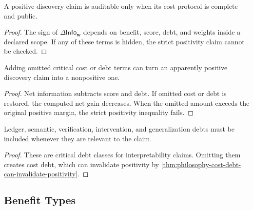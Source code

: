
\begin{theorem}
\label{thm:philosophy-positive-discovery-requires-protocol-completeness}
A positive discovery claim is auditable only when its cost protocol is
complete and public.
\end{theorem}
\begin{proof}
The sign of $\Delta\mathsf{Info}_{\mathbf w}$ depends on benefit, score,
debt, and weights inside a declared scope. If any of these terms is
hidden, the strict positivity claim cannot be checked.
\end{proof}

\begin{theorem}
\label{thm:philosophy-cost-debt-can-invalidate-positivity}
Adding omitted critical cost or debt terms can turn an apparently
positive discovery claim into a nonpositive one.
\end{theorem}
\begin{proof}
Net information subtracts score and debt. If omitted cost or debt is
restored, the computed net gain decreases. When the omitted amount
exceeds the original positive margin, the strict positivity inequality
fails.
\end{proof}

\begin{corollary}
\label{cor:philosophy-positive-discovery-counts-critical-debts}
Ledger, semantic, verification, intervention, and generalization debts
must be included whenever they are relevant to the claim.
\end{corollary}
\begin{proof}
These are critical debt classes for interpretability claims. Omitting
them creates cost debt, which can invalidate positivity by
\autoref{thm:philosophy-cost-debt-can-invalidate-positivity}.
\end{proof}

\subsection{Benefit Types}
\label{subsec:philosophy-positive-discovery-benefit-types}


